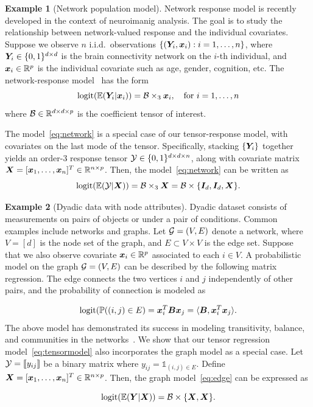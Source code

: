 \documentclass{article}
\theoremstyle{plain}
\theoremstyle{definition}
\newtheorem{example}{Example}
\begin{document}
\begin{example}[Network population model] 
Network response model is recently developed in the context of neuroimanig analysis. The goal is to study the relationship between network-valued response and the individual covariates. Suppose we observe $n$ i.i.d.\ observations $\{(\bm Y_i, \bm x_i): i=1,\ldots,n\}$, where $\bm Y_i\in\{0,1\}^{d\times d}$ is the brain connectivity network on the $i$-th individual, and $\bm x_i\in\mathbb{R}^p$ is the individual covariate such as age, gender, cognition, etc. The network-response model~\cite{rabusseau2016low, zhang2018network} has the form
\begin{equation}\label{eq:network}
\text{logit}(\mathbb{E}(\bm Y_i|\bm x_i))=\mathcal{B}\times_3\bm x_i, \quad \text{for }i=1,\ldots,n
\end{equation}
where $\mathcal{B}\in \mathbb{R}^{d\times d\times p}$ is the coefficient tensor of interest. 

The model~\eqref{eq:network} is a special case of our tensor-response model, with covariates on the last mode of the tensor. Specifically, stacking $\{\bm Y_i\}$ together
yields an order-3 response tensor $\mathcal{Y}\in\{0,1\}^{d\times d\times n}$, along with covariate matrix $\bm X=[\bm x_1,\ldots,\bm x_n]^T\in\mathbb{R}^{n\times p}$. Then, the model~\eqref{eq:network} can be written as
\[
\text{logit}(\mathbb{E}(\mathcal{Y}|\bm X))=\mathcal{B}\times_3 \bm X=\mathcal{B}\times\{\bm I_d, \bm I_d, \bm X\}.
\]
 \end{example}

 \begin{example}[Dyadic data with node attributes]
{Dyadic dataset consists of measurements on pairs of objects or under a pair of conditions. Common examples include networks and graphs. Let $\mathcal{G}=(V,E)$ denote a network, where $V=[d]$ is the node set of the graph, and $E\subset V\times V$ is the edge set. Suppose that we also observe covariate $\bm x_i\in\mathbb{R}^p$ associated to each $i\in V$. A probabilistic model on the graph $\mathcal{G}=(V,E)$ can be described by the following matrix regression. The edge connects the two vertices $i$ and $j$ independently of other pairs, and the probability of connection is modeled as}
 
\begin{equation}\label{eq:edge}
 \text{logit}(\mathbb{P}((i,j)\in E)=\bm x^T_i\bm B\bm x_j=\langle \bm B, \bm x^T_i\bm x_j\rangle.
 \end{equation}
{The above model has demonstrated its success in modeling transitivity, balance, and communities in the networks~\cite{hoff2005bilinear}. We show that our tensor regression model~\eqref{eq:tensormodel} also incorporates the graph model as a special case. Let $\mathcal{Y}=\llbracket y_{ij} \rrbracket$ be a binary matrix where $y_{ij}=\mathds{1}_{(i,j)\in E}$. Define $\bm X=[\bm x_1,\ldots,\bm x_n]^T\in\mathbb{R}^{n\times p}$. Then, the graph model~\eqref{eq:edge} can be expressed as}

 \[
 \text{logit}(\mathbb{E}(\bm Y|\bm X))=\mathcal{B}\times\{\bm X,\bm X\}.
 \]
\end{example}
\end{document}
